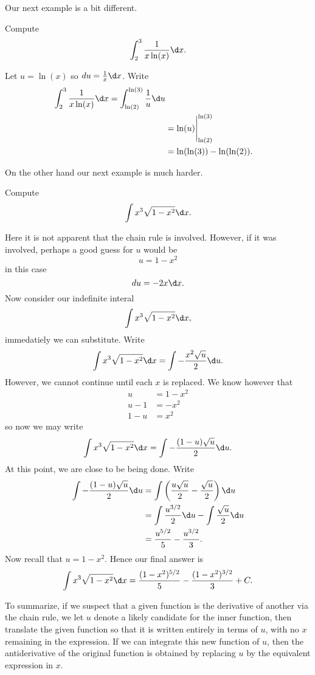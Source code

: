 Our next example is a bit different.

\begin{example}
Compute
\[
\int_{2}^{3} \frac{1}{x\ln(x)} \d x.
\]
\end{example}

\begin{solution}
Let $u=\ln(x)$ so $du=\frac{1}{x}\d x$. Write
\begin{align*}
\int_{2}^{3} \frac{1}{x\ln(x)} \d x = \int_{\ln(2)}^{\ln(3)} \frac{1}{u} \d u\\
&= \ln(u) \Biggr|_{\ln(2)}^{\ln(3)}\\
& = \ln(\ln(3)) - \ln(\ln(2)).
\end{align*}
\end{solution}


On the other hand our next example is much harder.

\begin{example} Compute
\[
\int x^3\sqrt{1-x^2}\d x.
\]
\end{example}

\begin{solution} 
Here it is not apparent that the chain rule is involved. However, if
it was involved, perhaps a good guess for $u$ would be
\[
u = 1-x^2
\]
in this case
\[
du = -2x \d x.
\]
Now consider our indefinite interal
\[
\int x^3\sqrt{1-x^2}\d x,
\]
immedatiely we can substitute. Write
\[
\int x^3\sqrt{1-x^2}\d x = \int -\frac{x^2\sqrt{u}}{2}\d u.
\]
However, we cannot continue until each $x$ is replaced. We know however that 
\begin{align*}
u &= 1-x^2 \\
u -1 &= -x^2\\
1- u &= x^2
\end{align*}
so now we may write
\[
\int x^3\sqrt{1-x^2}\d x = \int -\frac{(1-u)\sqrt{u}}{2}\d u.
\]
At this point, we are close to be being done. Write
\begin{align*}
\int -\frac{(1-u)\sqrt{u}}{2}\d u &= \int \left(\frac{u\sqrt{u}}{2} - \frac{\sqrt{u}}{2}\right) \d u \\
&= \int \frac{u^{3/2}}{2} \d u - \int \frac{\sqrt{u}}{2} \d u \\
&= \frac{u^{5/2}}{5} - \frac{u^{3/2}}{3}.
\end{align*}
Now recall that $u = 1-x^2$. Hence our final answer is
\[
\int x^3\sqrt{1-x^2}\d x = \frac{(1-x^2)^{5/2}}{5} - \frac{(1-x^2)^{3/2}}{3}+C.
\]
\end{solution}

To summarize, if we suspect that a given function is the derivative of
another via the chain rule, we let $u$ denote a likely candidate for
the inner function, then translate the given function so that it is
written entirely in terms of $u$, with no $x$ remaining in the
expression. If we can integrate this new function of $u$, then the
antiderivative of the original function is obtained by replacing $u$
by the equivalent expression in $x$.



